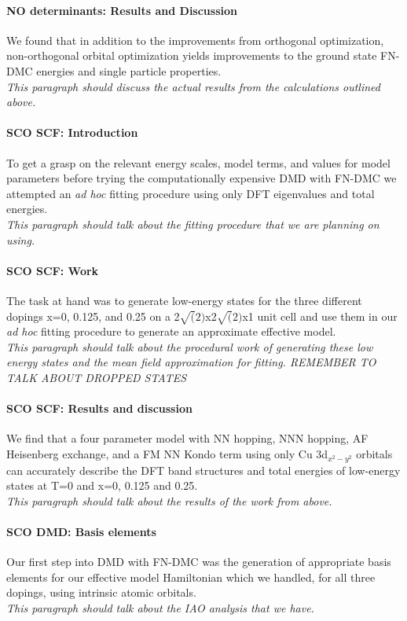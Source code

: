 \documentclass{article}
\begin{document}
\paragraph{NO determinants: Results and Discussion} We found that in addition to the improvements from orthogonal optimization, non-orthogonal orbital optimization yields improvements to the ground state FN-DMC energies and single particle properties.
\\
\textit{This paragraph should discuss the actual results from the calculations outlined above.}

\paragraph{SCO SCF: Introduction} To get a grasp on the relevant energy scales, model terms, and values for model parameters before trying the computationally expensive DMD with FN-DMC we attempted an \textit{ad hoc} fitting procedure using only DFT eigenvalues and total energies. 
\\
\textit{This paragraph should talk about the fitting procedure that we are planning on using.}

\paragraph{SCO SCF: Work} The task at hand was to generate low-energy states for the three different dopings x=0, 0.125, and 0.25 on a 2$\sqrt(2)$x2$\sqrt(2)$x1 unit cell and use them in our \textit{ad hoc} fitting procedure to generate an approximate effective model.
\\
\textit{This paragraph should talk about the procedural work of generating these low energy states and the mean field approximation for fitting. REMEMBER TO TALK ABOUT DROPPED STATES}

\paragraph{SCO SCF: Results and discussion} We find that a four parameter model with NN hopping, NNN hopping, AF Heisenberg exchange, and a FM NN Kondo term using only Cu 3d$_{x^2-y^2}$ orbitals can accurately describe the DFT band structures and total energies of low-energy states at T=0 and x=0, 0.125 and 0.25.
\\
\textit{This paragraph should talk about the results of the work from above.}

\paragraph{SCO DMD: Basis elements} Our first step into DMD with FN-DMC was the generation of appropriate basis elements for our effective model Hamiltonian which we handled, for all three dopings, using intrinsic atomic orbitals.
\\
\textit{This paragraph should talk about the IAO analysis that we have.}
\end{document}
